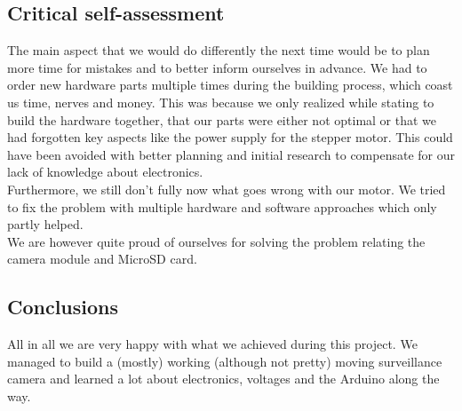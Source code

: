 \documentclass{article}
\begin{document}
\subsection{Critical self-assessment}
The main aspect that we would do differently the next time would be to plan more time for mistakes and to better inform ourselves in advance. We had to order new hardware parts multiple times during the building process, which coast us time, nerves and money. This was because we only realized while stating to build the hardware together, that our parts were either not optimal or that we had forgotten key aspects like the power supply for the stepper motor. This could have been avoided with better planning and initial research to compensate for our lack of knowledge about electronics.\\
Furthermore, we still don't fully now what goes wrong with our motor. We tried to fix the problem with multiple hardware and software approaches which only partly helped.\\
We are however quite proud of ourselves for solving the problem relating the camera module and MicroSD card.

\subsection{Conclusions}
All in all we are very happy with what we achieved during this project. We managed to build a (mostly) working (although not pretty) moving surveillance camera and learned a lot about electronics, voltages and the Arduino along the way. 

\newpage

\printbibliography
\end{document}
